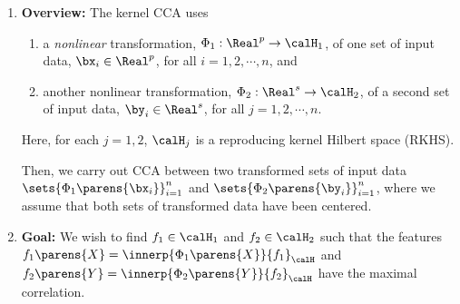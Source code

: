 \documentclass[12pt]{article}
\begin{document}
\begin{enumerate}[label=\textbf{\arabic*.}]

	\item \textbf{Overview:} The kernel CCA uses 
	\begin{enumerate}
		\item a \emph{nonlinear} transformation, $\Phi_1: \Real^p \to \calH_1$, of one set of input data, $\bx_i \in \Real^p$, for all $i = 1, 2, \cdots, n$, and 
		\item another nonlinear transformation, $\Phi_2: \Real^s \to \calH_2$, of a second set of input data, $\by_i \in \Real^s$, for all $j = 1, 2, \cdots, n$. 
	\end{enumerate}
	Here, for each $j = 1, 2$, $\calH_j$ is a reproducing kernel Hilbert space (RKHS). 
	
	Then, we carry out CCA between two transformed sets of input data $\sets{\Phi_1 \parens{\bx_i}}_{i=1}^n$ and $\sets{\Phi_2 \parens{\by_i}}_{i=1}^n$, where we assume that both sets of transformed data have been centered. 
	
	\item \textbf{Goal:} We wish to find $f_1 \in \calH_1$ and $f_2 \in \calH_2$ such that the features $f_1 \parens{X} = \innerp{\Phi_1 \parens{X}}{f_1}_{\calH}$ and $f_2 \parens{Y} = \innerp{\Phi_2 \parens{Y}}{f_2}_{\calH}$ have the maximal correlation. 
	

\end{enumerate}
\end{document}
